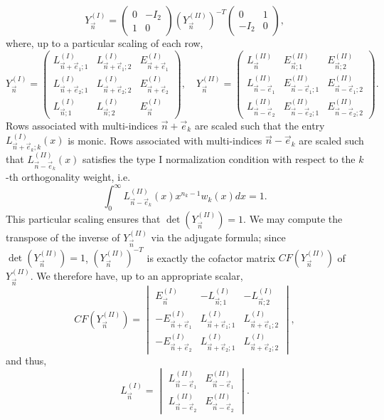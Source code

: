 \documentclass[a4paper,12pt,oneside]{article}
\theoremstyle{definition}
\begin{document}
   $$ Y_{\vec{n}}^{(I)} = \begin{pmatrix}
        0 & -I_2 \\
        1 & 0
    \end{pmatrix}
    (Y_{\vec{n}}^{(II)})^{-T}
    \begin{pmatrix}
        0 & 1 \\
        -I_2 & 0
    \end{pmatrix}, $$
where, up to a particular scaling of each row,
    $$ Y_{\vec{n}}^{(I)} = \begin{pmatrix} 
    L_{\vec{n}+\vec{e}_1;1}^{(I)} & L_{\vec{n}+\vec{e}_1;2}^{(I)} & E_{\vec{n}+\vec{e}_1}^{(I)} \\ 
    L_{\vec{n}+\vec{e}_2;1}^{(I)} & L_{\vec{n}+\vec{e}_2;2}^{(I)} & E_{\vec{n}+\vec{e}_2}^{(I)} \\ 
    L_{\vec{n};1}^{(I)} & L_{\vec{n};2}^{(I)} & E_{\vec{n}}^{(I)}
    \end{pmatrix},\quad 
    Y_{\vec{n}}^{(II)} = \begin{pmatrix} L_{\vec{n}}^{(II)} & E_{\vec{n};1}^{(II)} & E_{\vec{n};2}^{(II)} \\
    L_{\vec{n}-\vec{e}_1}^{(II)} & E_{\vec{n}-\vec{e}_1;1}^{(II)} & E_{\vec{n}-\vec{e}_1;2}^{(II)} \\ 
    L_{\vec{n}-\vec{e}_2}^{(II)} & E_{\vec{n}-\vec{e}_2;1}^{(II)} & E_{\vec{n}-\vec{e}_2;2}^{(II)} 
    \end{pmatrix}. $$
Rows associated with multi-indices $\vec{n}+\vec{e}_k$ are scaled such that the entry $L_{\vec{n}+\vec{e}_k;k}^{(I)}(x)$ is monic. Rows associated with multi-indices $\vec{n}-\vec{e}_k$ are scaled such that $L_{\vec{n}-\vec{e}_k}^{(II)}(x)$ satisfies the type I normalization condition with respect to the $k$-th orthogonality weight, i.e.
    $$ \int_0^\infty L_{\vec{n}-\vec{e}_k}^{(II)}(x) x^{n_k-1} w_k(x) dx = 1. $$
This particular scaling ensures that $\det(Y_{\vec{n}}^{(II)})=1$. We may compute the transpose of the inverse of $Y_{\vec{n}}^{(II)}$ via the adjugate formula; since $\det(Y_{\vec{n}}^{(II)})=1$, $(Y_{\vec{n}}^{(II)})^{-T} $ is exactly the cofactor matrix $CF(Y_{\vec{n}}^{(II)})$ of $Y_{\vec{n}}^{(II)}$. We therefore have, up to an appropriate scalar,
\begin{equation} \label{L_I_cof}
    CF(Y_{\vec{n}}^{(II)}) = \begin{vmatrix} 
    E_{\vec{n}}^{(I)} & -L_{\vec{n};1}^{(I)} & -L_{\vec{n};2}^{(I)} \\ 
    -E_{\vec{n}+\vec{e}_1}^{(I)} & L_{\vec{n}+\vec{e}_1;1}^{(I)} & L_{\vec{n}+\vec{e}_1;2}^{(I)} \\ 
    -E_{\vec{n}+\vec{e}_2}^{(I)} & L_{\vec{n}+\vec{e}_2;1}^{(I)} & L_{\vec{n}+\vec{e}_2;2}^{(I)}
    \end{vmatrix},
\end{equation}
and thus,
\begin{equation} \label{L_I_det}
    L_{\vec{n}}^{(I)} = \begin{vmatrix} L_{\vec{n}-\vec{e}_1}^{(II)} & E_{\vec{n}-\vec{e}_1}^{(II)} \\ L_{\vec{n}-\vec{e}_2}^{(II)} & E_{\vec{n}-\vec{e}_2}^{(II)} \end{vmatrix}.
\end{equation}
\end{document}
